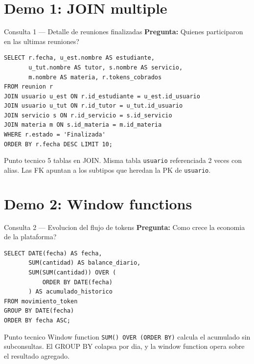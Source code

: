 ﻿\documentclass[11pt,aspectratio=169]{beamer}
\begin{document}
\section{Demo 1: JOIN multiple}

\begin{frame}[fragile]{Consulta 1 --- Detalle de reuniones finalizadas}
    \textbf{Pregunta:} Quienes participaron en las ultimas reuniones?

    \begin{lstlisting}
SELECT r.fecha, u_est.nombre AS estudiante,
       u_tut.nombre AS tutor, s.nombre AS servicio,
       m.nombre AS materia, r.tokens_cobrados
FROM reunion r
JOIN usuario u_est ON r.id_estudiante = u_est.id_usuario
JOIN usuario u_tut ON r.id_tutor = u_tut.id_usuario
JOIN servicio s ON r.id_servicio = s.id_servicio
JOIN materia m ON s.id_materia = m.id_materia
WHERE r.estado = 'Finalizada'
ORDER BY r.fecha DESC LIMIT 10;
    \end{lstlisting}

    \begin{block}{Punto tecnico}
        5 tablas en JOIN. Misma tabla \texttt{usuario} referenciada 2 veces con alias. Las FK apuntan a los subtipos que heredan la PK de \texttt{usuario}.
    \end{block}
\end{frame}

\section{Demo 2: Window functions}

\begin{frame}[fragile]{Consulta 2 --- Evolucion del flujo de tokens}
    \textbf{Pregunta:} Como crece la economia de la plataforma?

    \begin{lstlisting}
SELECT DATE(fecha) AS fecha,
       SUM(cantidad) AS balance_diario,
       SUM(SUM(cantidad)) OVER (
           ORDER BY DATE(fecha)
       ) AS acumulado_historico
FROM movimiento_token
GROUP BY DATE(fecha)
ORDER BY fecha ASC;
    \end{lstlisting}

    \begin{block}{Punto tecnico}
        Window function \texttt{SUM() OVER (ORDER BY)} calcula el acumulado sin subconsultas. El GROUP BY colapsa por dia, y la window function opera sobre el resultado agregado.
    \end{block}
\end{frame}
\end{document}
